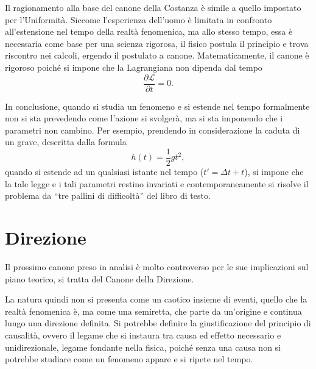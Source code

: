 \documentclass[11pt,a4paper]{article}
\begin{document}
Il ragionamento alla base del canone della Costanza è simile a quello impostato per l’Uniformità. Siccome l’esperienza dell’uomo è limitata in confronto all’estensione nel tempo della realtà fenomenica, ma allo stesso tempo, essa è necessaria come base per una scienza rigorosa, il fisico postula il principio e trova riscontro nei calcoli, ergendo il postulato a canone. Matematicamente, il canone è rigoroso poiché si impone che la Lagrangiana non dipenda dal tempo \begin{equation}\frac{\partial\mathcal{L}}{\partial t}=0.\end{equation} 

In conclusione, quando si studia un fenomeno e si estende nel tempo formalmente non si sta prevedendo come l’azione si svolgerà, ma si sta imponendo che i parametri non cambino. Per esempio, prendendo in considerazione la caduta di un grave, descritta dalla formula \begin{equation}h(t)=\frac{1}{2}gt^2,\end{equation} quando si estende ad un qualsiasi istante nel tempo ($t'=\Delta t+t$), si impone che la tale legge e i tali parametri restino invariati e contemporaneamente si risolve il problema da “tre pallini di difficoltà” del libro di testo. \section{Direzione}

Il prossimo canone preso in analisi è molto controverso per le sue implicazioni sul piano teorico, si tratta del Canone della Direzione. 

La natura quindi non si presenta come un caotico insieme di eventi, quello che la realtà fenomenica è, ma come una semiretta, che parte da un'origine e continua lungo una direzione definita. Si potrebbe definire la giustificazione del principio di causalità, ovvero il legame che si instaura tra causa ed effetto necessario e unidirezionale, legame fondante nella fisica, poiché senza una causa non si potrebbe studiare come un fenomeno appare e si ripete nel tempo. 
\end{document}
